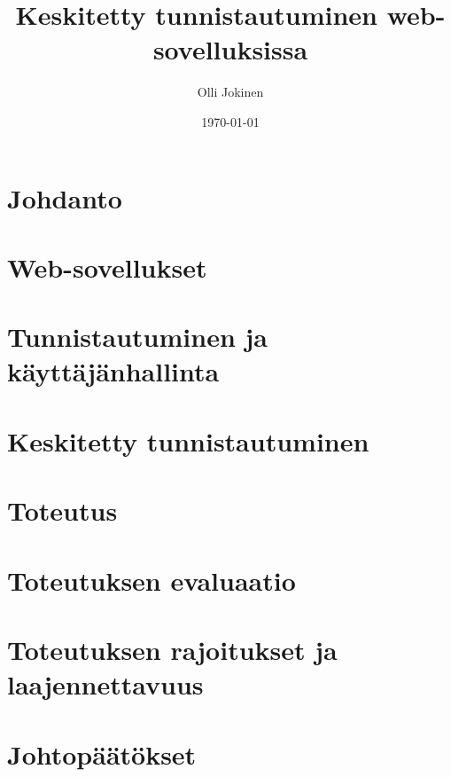 \documentclass{tktltiki}
\begin{document}
\title{Keskitetty tunnistautuminen web-sovelluksissa}
\author{Olli Jokinen}
\date{\today}
\maketitle
\doublespacing
{}
\subject{Tietojenkäsittelytiede}
\additionalinformation{}
\begin{abstract}

\end{abstract}
\mytableofcontents
\section{Johdanto}

\section{Web-sovellukset}

\section{Tunnistautuminen ja käyttäjänhallinta}

\section{Keskitetty tunnistautuminen}

\section{Toteutus}

\section{Toteutuksen evaluaatio}

\section{Toteutuksen rajoitukset ja laajennettavuus}

\section{Johtopäätökset}




\lastpage
\end{document}
